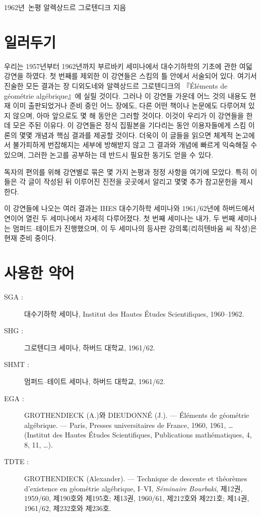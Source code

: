 \unit{1962년 논평}
%
  {알렉상드르 그로텐디크 지음}

\section*{일러두기}

우리는 1957년부터 1962년까지 부르바키 세미나에서 대수기하학의 기초에
관한 여덟 강연을 하였다. 첫 번째를 제외한 이 강연들은 스킴의 틀 안에서
서술되어 있다. 여기서 진술한 모든 결과는 장 디외도네와 알렉상드르
그로텐디크의 『Éléments de géométrie algébrique』에 실릴 것이다. 그러나
이 강연들 가운데 어느 것의 내용도 현재 이미 출판되었거나 준비 중인 어느
장에도, 다른 어떤 책이나 논문에도 다루어져 있지 않으며, 아마 앞으로도
몇 해 동안은 그러할 것이다. 이것이 우리가 이 강연들을 한데 모은 주된
이유다. 이 강연들은 정식 집필본을 기다리는 동안 이용자들에게 스킴 이론의
몇몇 개념과 핵심 결과를 제공할 것이다. 더욱이 이 글들을 읽으면 체계적
논고에서 불가피하게 번잡해지는 세부에 방해받지 않고 그 결과와 개념에
빠르게 익숙해질 수 있으며, 그러한 논고를 공부하는 데 반드시 필요한
동기도 얻을 수 있다.

독자의 편의를 위해 강연별로 묶은 몇 가지 논평과 정정 사항을 여기에
모았다. 특히 이들은 각 글이 작성된 뒤 이루어진 진전을 곳곳에서 알리고
몇몇 추가 참고문헌을 제시한다.

이 강연들에 나오는 여러 결과는 IHES 대수기하학 세미나와 1961/62년에
하버드에서 연이어 열린 두 세미나에서 자세히 다루어졌다. 첫 번째 세미나는
내가, 두 번째 세미나는 멈퍼드--테이트가 진행했으며, 이 두 세미나의 등사판
강의록(리히텐바움 씨 작성)은 현재 준비 중이다.

\section*{사용한 약어}

\begin{description}
\item[SGA :] 대수기하학 세미나, Institut des Hautes Études Scientifiques,
1960--1962.

\item[SHG :] 그로텐디크 세미나, 하버드 대학교, 1961/62.

\item[SHMT :] 멈퍼드--테이트 세미나, 하버드 대학교, 1961/62.

\item[EGA :] GROTHENDIECK (A.)와 DIEUDONNÉ (J.). --- Éléments de géométrie
algébrique. --- Paris, Presses universitaires de France, 1960, 1961, …
(Institut des Hautes Études Scientifiques, Publications mathématiques, 4, 8,
11, …).

\item[TDTE :] GROTHENDIECK (Alexander). --- Technique de descente et théorèmes
d'existence en géométrie algébrique, I--VI, \emph{Séminaire Bourbaki}, 제12권,
1959/60, 제190호와 제195호; 제13권, 1960/61, 제212호와 제221호; 제14권,
1961/62, 제232호와 제236호.
\end{description}

